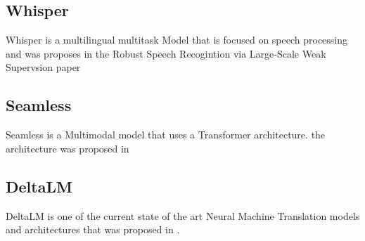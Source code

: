 \subsection{Whisper}
Whisper is a multilingual multitask Model that is focused on speech processing and was proposes in the Robust Speech Recogintion via Large-Scale Weak Supervsion paper \cite{radford2022robust} 
\subsection{Seamless}
Seamless is a Multimodal model that uses a Transformer architecture. 
the architecture was proposed in \cite{communication2023seamlessm4t} 

\subsection{DeltaLM}
DeltaLM is one of the current state of the art Neural Machine Translation models and architectures that was proposed in \cite{ma2021deltalm}. 
